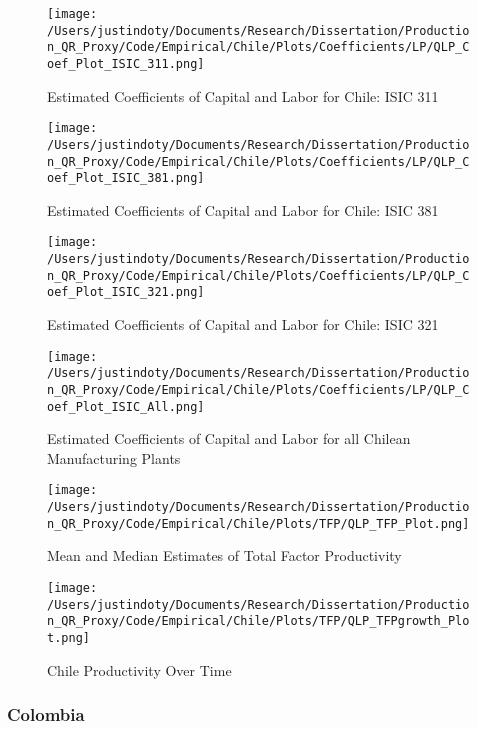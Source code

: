 \documentclass[11pt]{article}
\begin{document}
\begin{figure}[H]
\centering
\caption{Estimated Coefficients of Capital and Labor for Chile: ISIC 311}
\texttt{[image: /Users/justindoty/Documents/Research/Dissertation/Production\_QR\_Proxy/Code/Empirical/Chile/Plots/Coefficients/LP/QLP\_Coef\_Plot\_ISIC\_311.png]}
\label{fig:LPCHL311}
\end{figure}

\begin{figure}[H]
\centering
\caption{Estimated Coefficients of Capital and Labor for Chile: ISIC 381}
\texttt{[image: /Users/justindoty/Documents/Research/Dissertation/Production\_QR\_Proxy/Code/Empirical/Chile/Plots/Coefficients/LP/QLP\_Coef\_Plot\_ISIC\_381.png]}
\label{fig:LPCHL381}
\end{figure}

\begin{figure}[H]
\centering
\caption{Estimated Coefficients of Capital and Labor for Chile: ISIC 321}
\texttt{[image: /Users/justindoty/Documents/Research/Dissertation/Production\_QR\_Proxy/Code/Empirical/Chile/Plots/Coefficients/LP/QLP\_Coef\_Plot\_ISIC\_321.png]}
\label{fig:LPCHL321}
\end{figure}

\begin{figure}[H]
\centering
\caption{Estimated Coefficients of Capital and Labor for all Chilean Manufacturing Plants}
\texttt{[image: /Users/justindoty/Documents/Research/Dissertation/Production\_QR\_Proxy/Code/Empirical/Chile/Plots/Coefficients/LP/QLP\_Coef\_Plot\_ISIC\_All.png]}
\label{fig:LPCHLall}
\end{figure}

\begin{figure}[H]
\centering
\caption{Mean and Median Estimates of Total Factor Productivity}
\texttt{[image: /Users/justindoty/Documents/Research/Dissertation/Production\_QR\_Proxy/Code/Empirical/Chile/Plots/TFP/QLP\_TFP\_Plot.png]}
\label{fig:LPTFPDens}
\end{figure}

\begin{figure}[H]
\centering
\caption{Chile Productivity Over Time}
\texttt{[image: /Users/justindoty/Documents/Research/Dissertation/Production\_QR\_Proxy/Code/Empirical/Chile/Plots/TFP/QLP\_TFPgrowth\_Plot.png]}
\label{fig:LPCHLpgrowth}
\end{figure}

\subsubsection{Colombia}
\end{document}
